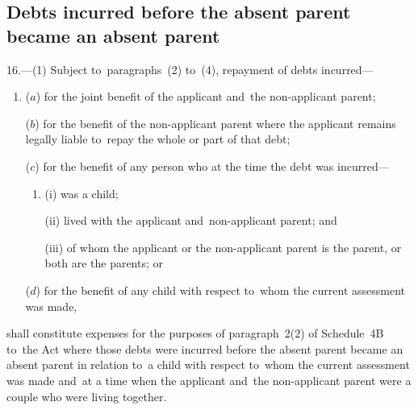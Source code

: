 \documentclass[12pt,a4paper]{article}
\begin{document}
\subsection[16. Debts incurred before the absent parent became an absent parent]{Debts incurred before the absent parent became an absent parent}

16.—(1) Subject
to~paragraphs~(2) to~(4), repayment of debts incurred—
\begin{enumerate}\item[]
($a$) for the joint benefit of the applicant and~the non-applicant parent;

($b$) for the benefit of the non-applicant parent where the applicant remains
legally liable to~repay the whole or part of that debt;

($c$) for the benefit of any person who at the time the debt was incurred—
\begin{enumerate}\item[]
(i) was a child;

(ii) lived with the applicant and~non-applicant parent; and

(iii) of whom the applicant or the non-applicant parent is the parent, or both
are the parents; or
\end{enumerate}

($d$) for the benefit of any child with respect to~whom the current assessment was
made,
\end{enumerate}
shall constitute expenses for the purposes of paragraph~2(2) of Schedule~4B to~the Act where those debts were incurred before the absent parent became an absent parent in relation to~a child with respect to~whom the current assessment was made and~at a time when the applicant and~the non-applicant parent were 
a couple  %
who were living together.
\end{document}
